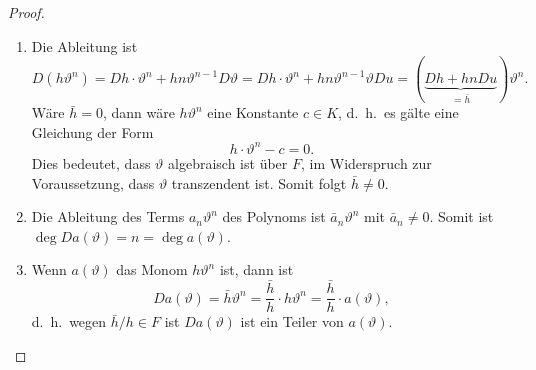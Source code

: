 \begin{proof}
\begin{enumerate}
\item
Die Ableitung ist
\[
D(h\vartheta^n)
=
Dh\cdot\vartheta^n + hn\vartheta^{n-1}D\vartheta
=
Dh\cdot\vartheta^n + hn\vartheta^{n-1} \vartheta Du
=
(\underbrace{Dh+ hn Du}_{\displaystyle=\bar{h}}) \vartheta^n.
\]
Wäre $\bar{h}=0$, dann wäre $h\vartheta^n$ eine Konstante $c\in K$,
d.~h.~es gälte eine Gleichung der Form
\[
h\cdot \vartheta^n - c = 0.
\]
Dies bedeutet, dass $\vartheta$ algebraisch ist über $F$, im Widerspruch
zur Voraussetzung, dass $\vartheta$ transzendent ist.
Somit folgt $\bar{h}\ne 0$.
\item
Die Ableitung des Terms $a_n\vartheta^n$ des Polynoms ist
$\bar{a}_n\vartheta^n$ mit $\bar{a}_n\ne 0$.
Somit ist $\deg Da(\vartheta) = n = \deg a(\vartheta)$.
\item
Wenn $a(\vartheta)$ das Monom $h\vartheta^n$ ist, dann ist
\[
Da(\vartheta)
=
\bar{h}\vartheta^n
=
\frac{\bar{h}}{h}
\cdot
h\vartheta^n
=
\frac{\bar{h}}{h}
\cdot
a(\vartheta),
\]
d.~h.~wegen $\bar{h}/h\in F$ ist $Da(\vartheta)$ ist ein Teiler von
$a(\vartheta)$.


\end{enumerate}
\end{proof}
